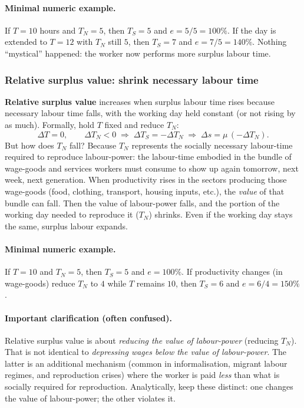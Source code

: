 \paragraph{Minimal numeric example.}
If $T=10$ hours and $T_N=5$, then $T_S=5$ and $e=5/5=100\%$.
If the day is extended to $T=12$ with $T_N$ still $5$, then $T_S=7$ and $e=7/5=140\%$.
Nothing “mystical” happened: the worker now performs more surplus labour time.

\subsubsection*{Relative surplus value: shrink necessary labour time}

\textbf{Relative surplus value} increases when surplus labour time rises because necessary labour
time falls, with the working day held constant (or not rising by as much). Formally, hold $T$ fixed
and reduce $T_N$:
\[
  \Delta T = 0,
  \qquad
  \Delta T_N < 0
  \;\Rightarrow\;
  \Delta T_S = -\Delta T_N
  \;\Rightarrow\;
  \Delta s = \mu\,(-\Delta T_N).
\]
But how does $T_N$ fall? Because $T_N$ represents the socially necessary labour-time required
to reproduce labour-power: the labour-time embodied in the bundle of wage-goods and services
workers must consume to show up again tomorrow, next week, next generation. When productivity
rises in the sectors producing those wage-goods (food, clothing, transport, housing inputs, etc.),
the \emph{value} of that bundle can fall. Then the value of labour-power falls, and the portion of
the working day needed to reproduce it ($T_N$) shrinks. Even if the working day stays the same,
surplus labour expands.

\paragraph{Minimal numeric example.}
If $T=10$ and $T_N=5$, then $T_S=5$ and $e=100\%$.
If productivity changes (in wage-goods) reduce $T_N$ to $4$ while $T$ remains $10$,
then $T_S=6$ and $e=6/4=150\%$.

\paragraph{Important clarification (often confused).}
Relative surplus value is about \emph{reducing the value of labour-power} (reducing $T_N$).
That is not identical to \emph{depressing wages below the value of labour-power}.
The latter is an additional mechanism (common in informalisation, migrant labour regimes, and
reproduction crises) where the worker is paid \emph{less} than what is socially required for reproduction.
Analytically, keep these distinct: one changes the value of labour-power; the other violates it.

